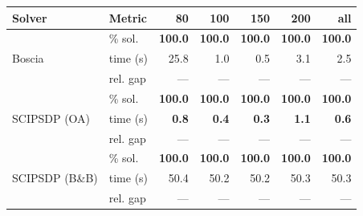 \begin{tabular}{llrrrrr}
\toprule
 Solver & Metric & 80 & 100 & 150 & 200 & all \\
\midrule
\multirow{3}{*}{Boscia} & \% sol. & \textbf{100.0} & \textbf{100.0} & \textbf{100.0} & \textbf{100.0} & \textbf{100.0} \\
  & time (s) & 25.8 & 1.0 & 0.5 & 3.1 & 2.5 \\
  & rel. gap & --- & --- & --- & --- & --- \\
\midrule
\multirow{3}{*}{SCIPSDP (OA)} & \% sol. & \textbf{100.0} & \textbf{100.0} & \textbf{100.0} & \textbf{100.0} & \textbf{100.0} \\
  & time (s) & \textbf{0.8} & \textbf{0.4} & \textbf{0.3} & \textbf{1.1} & \textbf{0.6} \\
  & rel. gap & --- & --- & --- & --- & --- \\
\midrule
\multirow{3}{*}{SCIPSDP (B\&B)} & \% sol. & \textbf{100.0} & \textbf{100.0} & \textbf{100.0} & \textbf{100.0} & \textbf{100.0} \\
  & time (s) & 50.4 & 50.2 & 50.2 & 50.3 & 50.3 \\
  & rel. gap & --- & --- & --- & --- & --- \\
\bottomrule
\end{tabular}
